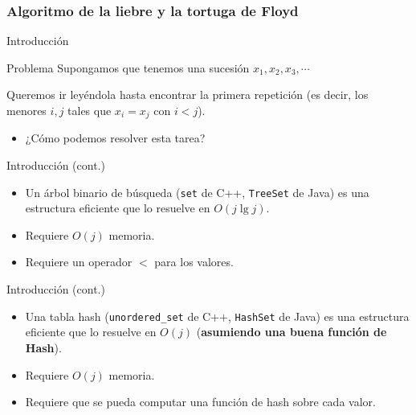 \documentclass{beamer}
\begin{document}
\subsubsection{Algoritmo de la liebre y la tortuga de Floyd}

\begin{frame}{Introducción}
    \begin{block}{Problema}
        Supongamos que tenemos una sucesión $x_1, x_2, x_3, \cdots$ 
        
        Queremos ir leyéndola hasta encontrar la primera repetición (es decir, los menores $i,j$ tales que $x_i=x_j$ con $i < j$).
    \end{block}
    \begin{itemize}
      \item ¿Cómo podemos resolver esta tarea?
      \pause
    \end{itemize}
\end{frame}

\begin{frame}{Introducción (cont.)}
    \begin{itemize}
         \item Un árbol binario de búsqueda (\texttt{set} de C++, \texttt{TreeSet} de Java) es una estructura eficiente que lo resuelve en $O(j \lg j)$.
         \item Requiere $O(j)$ memoria.
         \item Requiere un operador $<$ para los valores.
    \end{itemize}
\end{frame}

\begin{frame}{Introducción (cont.)}
    \begin{itemize}
         \item Una tabla hash (\texttt{unordered\_set} de C++, \texttt{HashSet} de Java) es una estructura eficiente que lo resuelve en $O(j)$ (\textbf{asumiendo una buena función de Hash}).
         \item Requiere $O(j)$ memoria.
         \item Requiere que se pueda computar una función de hash sobre cada valor.
    \end{itemize}
\end{frame}
\end{document}
